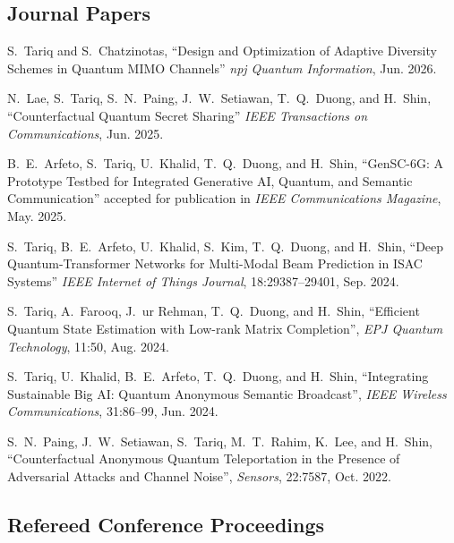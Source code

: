 \documentclass[10pt]{article}
\begin{document}
\subsection*{Journal Papers}	
\begin{enumerate}[ {[}1{]} ]

 \item S.~Tariq and S.~Chatzinotas, “Design and Optimization of Adaptive Diversity Schemes in Quantum MIMO Channels'' \emph{npj Quantum Information}, Jun. 2026.

\item N.~Lae, S.~Tariq, S.~N.~Paing, J.~W.~Setiawan, T.~Q.~Duong, and H.~Shin, “Counterfactual Quantum Secret Sharing'' \emph{IEEE Transactions on Communications}, Jun. 2025.  

\item B.~E.~Arfeto, S.~Tariq, U.~Khalid, T.~Q.~Duong, and H.~Shin, “GenSC-6G: A Prototype Testbed for Integrated Generative AI, Quantum, and Semantic Communication'' accepted for publication in \emph{IEEE Communications Magazine}, May. 2025.  

\item S.~Tariq, B.~E.~Arfeto, U.~Khalid, S.~Kim, T.~Q.~Duong, and H.~Shin, “Deep Quantum-Transformer Networks for Multi-Modal Beam Prediction in ISAC Systems'' \emph{IEEE Internet of Things Journal}, 18:29387–29401, Sep. 2024.  

\item S.~Tariq, A.~Farooq, J.~ur Rehman, T.~Q.~Duong, and H.~Shin, “Efficient Quantum State Estimation with Low-rank Matrix Completion'', \emph{EPJ Quantum Technology}, 11:50, Aug. 2024.  

\item S.~Tariq, U.~Khalid, B.~E.~Arfeto, T.~Q.~Duong, and H.~Shin, “Integrating Sustainable Big AI: Quantum Anonymous Semantic Broadcast'', \emph{IEEE Wireless Communications}, 31:86–99, Jun. 2024.  

\item S.~N.~Paing, J.~W.~Setiawan, S.~Tariq, M.~T.~Rahim, K.~Lee, and H.~Shin, “Counterfactual Anonymous Quantum Teleportation in the Presence of Adversarial Attacks and Channel Noise'', \emph{Sensors}, 22:7587, Oct. 2022.  



		


\end{enumerate}


\subsection*{Refereed Conference Proceedings}
\end{document}
